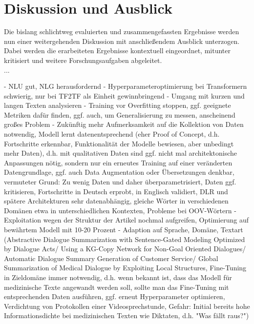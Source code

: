 \chapter{Diskussion und Ausblick}
\thispagestyle{fancy}
\label{chap:Diskussion und Ausblick}

\noindent
Die bislang schlichtweg evaluierten und zusammengefassten Ergebnisse werden nun einer weitergehenden Diskussion mit anschließendem Ausblick unterzogen. Dabei werden die erarbeiteten Ergebnisse kontextuell eingeordnet, mitunter kritisiert und weitere Forschungsaufgaben abgeleitet.\\

\noindent
...


- NLU gut, NLG herausfordernd
- Hyperparameteroptimierung bei Transformern schwierig, nur bei TF2TF als Einheit gewinnbringend
- Umgang mit kurzen und langen Texten analysieren
- Training vor Overfitting stoppen, ggf. geeignete Metriken dafür finden, ggf. auch, um Generalisierung zu messen, anscheinend großes Problem
- Zukünftig mehr Aufmerksamkeit auf die Kollektion von Daten notwendig, Modell lernt datenentsprechend (eher Proof of Concept, d.h. Fortschritte erkennbar, Funktionalität der Modelle bewiesen, aber unbedingt mehr Daten), d.h. mit qualitativen Daten sind ggf. nicht mal architektonische Anpassungen nötig, sondern nur ein erneutes Training auf einer veränderten Datengrundlage, ggf. auch Data Augmentation oder Übersetzungen denkbar, vermuteter Grund: Zu wenig Daten und daher überparametrisiert, Daten ggf. kritisieren, Fortschritte in Deutsch erprobt, in Englisch validiert, DLR und spätere Architekturen sehr datenabhängig, gleiche Wörter in verschiedenen Domänen etwa in unterschiedlichen Kontexten, Probleme bei OOV-Wörtern
- Exploitation wegen der Struktur der Artikel nochmal aufgreifen, Optimierung auf bewährtem Modell mit 10-20 Prozent
- Adaption auf Sprache, Domäne, Textart (Abstractive Dialogue Summarization with Sentence-Gated Modeling Optimized by Dialogue Acts/ Using a KG-Copy Network for Non-Goal Oriented Dialogues/ Automatic Dialogue Summary Generation of Customer Service/ Global Summarization of Medical Dialogue by Exploiting Local Structures, Fine-Tuning in Zieldomäne immer notwendig, d.h. wenn bekannt ist, dass das Modell für medizinische Texte angewandt werden soll, sollte man das Fine-Tuning mit entsprechenden Daten ausführen, ggf. erneut Hyperparameter optimieren, Verdichtung von Protokollen einer Videosprechstunde, Gefahr: Initial bereits hohe Informationsdichte bei medizinischen Texten wie Diktaten, d.h. "Was fällt raus?")
